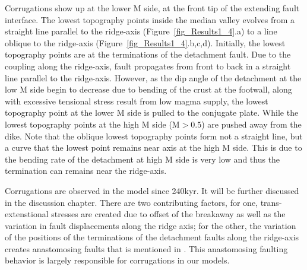  Corrugations show up at the lower M side, at the front tip of the extending fault interface. The lowest topography points inside the median valley evolves from a straight line parallel to the ridge-axis (Figure~\ref{fig_Results1_4}.a) to a line oblique to the ridge-axis (Figure~\ref{fig_Results1_4}.b,c,d). Initially, the lowest topography points are at the terminations of the detachment fault. Due to the coupling along the ridge-axis, fault propagates from front to back in a straight line parallel to the ridge-axis. However, as the dip angle of the detachment at the low M side begin to decrease due to bending of the crust at the footwall, along with excessive tensional stress result from low magma supply, the lowest topography point at the lower M side is pulled to the conjugate plate. While the lowest topography points at the high M side (M$>0.5$) are pushed away from the dike. Note that the oblique lowest topography points form not a straight line, but a curve that the lowest point remains near axis at the high M side. This is due to the bending rate of the detachment at high M side is very low and thus the termination can remains near the ridge-axis.      


Corrugations are observed in the model since 240kyr. It will be further discussed in the discussion chapter. There are two contributing factors, for one, trans-extenstional stresses are created due to offset of the breakaway as well as the variation in fault displacements along the ridge axis; for the other, the variation of the positions of the terminations of the detachment faults along the ridge-axis creates anastomosing faults that is mentioned in \citep{Smith2014}. This anastomosing faulting behavior is largely responsible for corrugations in our models.      

